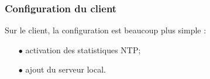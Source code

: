 \subsubsection{Configuration du client}
\label{subsubsec:configuration-client}

Sur le client, la configuration est beaucoup plus simple :
\begin{itemize}

    \item[$\bullet$] activation des statistiques NTP;
    \item[$\bullet$] ajout du serveur local.

\end{itemize}



